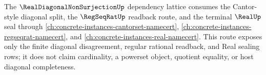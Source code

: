 The $\RealDiagonalNonSurjectionUp$ dependency lattice consumes the Cantor-style diagonal split, the $\RegSeqRatUp$ readback route, and the terminal $\RealUp$ seal through \autoref{ch:concrete-instances-cantorset-namecert}, \autoref{ch:concrete-instances-regseqrat-namecert}, and \autoref{ch:concrete-instances-real-namecert}. This route exposes only the finite diagonal disagreement, regular rational readback, and Real sealing rows; it does not claim cardinality, a powerset object, quotient equality, or host diagonal completeness.
